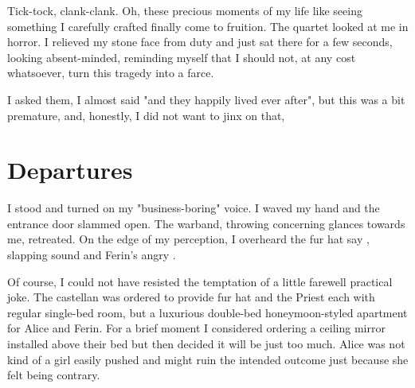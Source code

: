 Tick-tock, clank-clank. Oh, these precious moments of my life like seeing something I carefully crafted finally come to fruition. The quartet looked at me in horror. I relieved my stone face from duty and just sat there for a few seconds, looking absent-minded, reminding myself that I should not, at any cost whatsoever, turn this tragedy into a farce.

 I asked them,  I almost said "and they happily lived ever after", but this was a bit premature, and, honestly, I did not want to jinx on that, 

\section{Departures}

I stood and turned on my "business-boring" voice.  I waved my hand and the entrance door slammed open. The warband, throwing concerning glances towards me, retreated. On the edge of my perception, I overheard the fur hat say , slapping sound and Ferin's angry .

Of course, I could not have resisted the temptation of a little farewell practical joke. The castellan was ordered to provide fur hat and the Priest each with regular single-bed room, but a luxurious double-bed honeymoon-styled apartment for Alice and Ferin. For a brief moment I considered ordering a ceiling mirror installed above their bed but then decided it will be just too much. Alice was not kind of a girl easily pushed and might ruin the intended outcome just because she felt being contrary.

